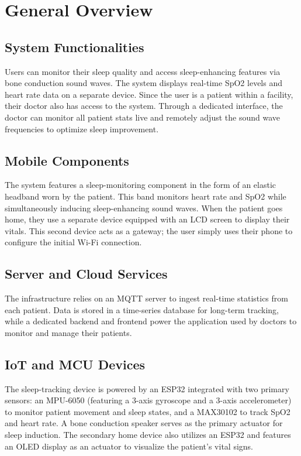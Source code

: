 \section{General Overview}
\label{sec:general_overview}


\subsection{System Functionalities}
Users can monitor their sleep quality and access sleep-enhancing
features via bone conduction sound waves. The system displays real-time SpO2​
levels and heart rate data on a separate device. Since the user is a patient within a facility,
their doctor also has access to the system. Through a dedicated interface, the doctor can
monitor all patient stats live and remotely adjust the sound wave frequencies to optimize
sleep improvement.
\subsection{Mobile Components}
The system features a sleep-monitoring component in the form of an elastic headband worn by the patient.
This band monitors heart rate and SpO2​ while simultaneously inducing sleep-enhancing sound waves.
When the patient goes home, they use a separate device equipped with an LCD screen to display their
vitals. This second device acts as a gateway; the user simply uses their phone to configure the initial
Wi-Fi connection.
\subsection{Server and Cloud Services}
The infrastructure relies on an MQTT server to ingest real-time statistics from each patient.
Data is stored in a time-series database for long-term tracking, while a dedicated
backend and frontend power the application used by doctors to monitor and manage their patients.
\subsection{IoT and MCU Devices}
The sleep-tracking device is powered by an ESP32 integrated with two primary sensors:
an MPU-6050 (featuring a 3-axis gyroscope and a 3-axis accelerometer) to monitor patient movement and
sleep states, and a MAX30102 to track SpO2​ and heart rate. A bone conduction speaker serves as the
primary actuator for sleep induction. The secondary home device also utilizes an ESP32 and features an
OLED display as an actuator to visualize the patient's vital signs.
